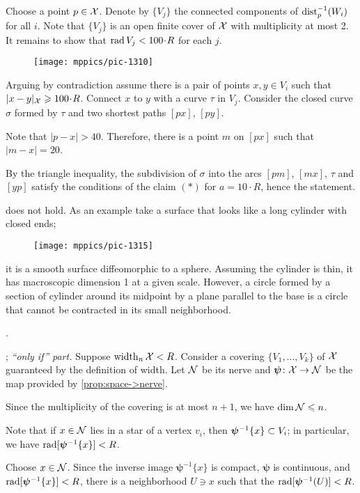 Choose a point $p\in \mathcal{X}$.
Denote by $\{V_j\}$ the connected components of $\mathrm{dist}_p^{-1}(W_i)$ for all $i$.
Note that $\{V_j\}$ is an open finite cover of $\mathcal{X}$ with multiplicity at most 2.
It remains to show that $\rad V_j<100\cdot R$ for each $j$.

\begin{wrapfigure}{o}{31 mm}
\vskip-2mm
\centering
\texttt{[image: mppics/pic-1310]}
\end{wrapfigure}

Arguing by contradiction assume there is a pair of points  $x,y\in V_i$ 
such that $|x\z-y|_{\spc{X}}\z\ge 100\cdot R$.
Connect $x$ to $y$ with a curve $\tau$ in $V_j$.
Consider the closed curve $\sigma$ formed by $\tau$ and two shortest paths $[px]$, $[py]$.


Note that $|p-x|>40$.
Therefore, there is a point $m$ on $[px]$ such that $|m-x|=20$.

By the triangle inequality, the subdivision of $\sigma$ into the arcs $[pm]$, $[mx]$, $\tau$ and $[yp]$ satisfy the conditions of the claim $({*})$ for $a=10\cdot R$,
hence the statement.

 does not hold.
As an example take a surface that looks like a long cylinder with closed ends;
\begin{figure}[h!]
\vskip0mm
\centering
\texttt{[image: mppics/pic-1315]}
\end{figure}
it is a smooth surface diffeomorphic to a sphere.
Assuming the cylinder is thin, it has macroscopic dimension 1 at a given scale.
However, a circle formed by a section of cylinder around its midpoint by a plane parallel to the base is a circle that cannot be contracted in its small neighborhood.

 \cite[Appendix $1(\text{E}_{2})$]{gromov-1983}.

\parbf{\ref{ex:width=suprad(inv)}}; \textit{``only if'' part.}
Suppose $\operatorname{\rm width}\nolimits_n\mathcal{X}<R$.
Consider a covering $\{V_1,\dots,V_k\}$ of $\mathcal{X}$ guaranteed by the definition of width.
Let $\mathcal{N}$ be its nerve and $\bm{\psi}\colon\mathcal{X}\to \mathcal{N}$ be the map provided by \ref{prop:space->nerve}.

Since the multiplicity of the covering is at most $n+1$, we have $\operatorname{\rm dim}\nolimits \mathcal{N}\leqslant n$.

Note that if $x\in \mathcal{N}$ lies in a star of a vertex $v_i$,
then $\bm{\psi}^{-1}\{x\}\z\subset V_i$;
in particular, we have $\mathop{\rm rad}\nolimits[\bm{\psi}^{-1}\{x\}]<R$.

Choose $x\in \mathcal{N}$.
Since the inverse image $\bm{\psi}^{-1}\{x\}$ is compact, $\bm{\psi}$ is continuous, and $\mathop{\rm rad}\nolimits[\bm{\psi}^{-1}\{x\}]<R$,
there is a neighborhood $U\ni x$ such that the  $\mathop{\rm rad}\nolimits[\bm{\psi}^{-1}(U)]<R$.

